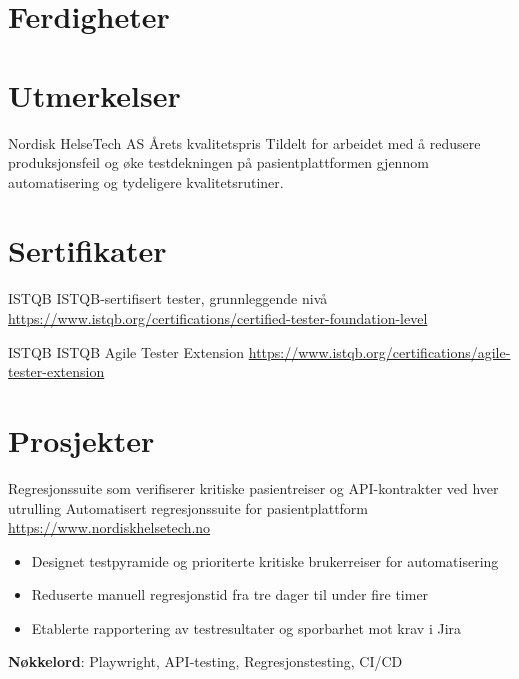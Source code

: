 \documentclass[a4paper, serif, 10pt]{moderncv}
\begin{document}
\section{Ferdigheter}

\section{Utmerkelser}

        {Nordisk HelseTech AS}
        {Årets kvalitetspris}
        {}
        {}
        {Tildelt for arbeidet med å redusere produksjonsfeil og øke testdekningen på pasientplattformen gjennom automatisering og tydeligere kvalitetsrutiner.}
\section{Sertifikater}

        {ISTQB}
        {ISTQB-sertifisert tester, grunnleggende nivå}
        {\url{https://www.istqb.org/certifications/certified-tester-foundation-level}}
        {}
        {}

        {ISTQB}
        {ISTQB Agile Tester Extension}
        {\url{https://www.istqb.org/certifications/agile-tester-extension}}
        {}
        {}
\section{Prosjekter}

        {Regresjonssuite som verifiserer kritiske pasientreiser og API-kontrakter ved hver utrulling}
        {Automatisert regresjonssuite for pasientplattform}
        {\url{https://www.nordiskhelsetech.no}}
        {}
        {\begin{itemize}
\item Designet testpyramide og prioriterte kritiske brukerreiser for automatisering
\item Reduserte manuell regresjonstid fra tre dager til under fire timer
\item Etablerte rapportering av testresultater og sporbarhet mot krav i Jira
\end{itemize}
\textbf{Nøkkelord}: Playwright, API-testing, Regresjonstesting, CI/CD}
\end{document}
